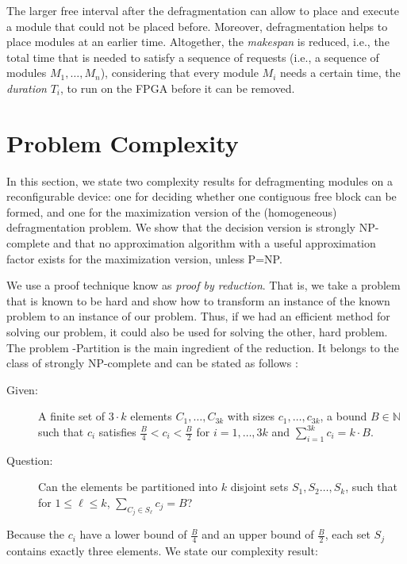 \documentclass{article}
\newcommand{\NP}{NP}
\newcommand{\POL}{P}
\newcommand{\N}{\mathbb{N}}
\begin{document}
The larger free interval after the defragmentation can allow to place and execute a module
that could not be placed before.  Moreover,
defragmentation helps to place modules at an earlier time.
Altogether, the {\em makespan} is reduced, i.e., the total
time that is needed to satisfy a sequence of requests (i.e., a
sequence of modules $M_1, \ldots, M_n$), considering that
every module $M_i$ needs a certain time, the {\em duration} $T_i$, to
run on the FPGA before it can be removed.


\section{Problem Complexity}
\label{sec:complexity}

In this section, we state two complexity results for defragmenting modules on a reconfigurable device: one for deciding whether
one contiguous free block can be formed,
and one for the maximization version of the (homogeneous) defragmentation
problem. We show that the decision version is strongly \NP-complete
and that no approximation algorithm with a
useful approximation factor exists for the maximization version,
unless \POL=\NP.

We use a proof technique know as {\em proof by reduction}. That is, we 
take a problem that is known to be hard and show how to transform 
an instance of the known problem to an instance of our problem. 
Thus, if we had an efficient method for solving our problem, it could also be
used for solving the other, hard problem.
The problem {-Partition} is the main ingredient of the reduction. It
belongs to the class of strongly NP-complete and can be stated as
follows \cite{Garey79}:

\begin{description}
\item[Given:] A finite set of $3\cdot k$ elements $C_1,\ldots,C_{3k}$ with sizes
$c_1,\ldots,c_{3k}$, a bound $B\in \N$ such that $c_i$ satisfies
$\frac{B}{4} < c_i < \frac{B}{2}$ for $i=1,\ldots,3k$ and 
$\sum_{i=1}^{3k} c_i = k\cdot B$.

\item[Question:]  Can the elements be partitioned into $k$ disjoint sets
$S_1,S_2\ldots,S_k$, such that for $1\leq \ell \leq k$, $\sum_{C_j \in
S_\ell} c_j = B$?
\end{description}

Because the $c_i$ have a lower bound of $\frac{B}{4}$ and an upper
bound of $\frac{B}{2}$, each set $S_j$ contains exactly three
elements. We state our complexity result:
\end{document}
